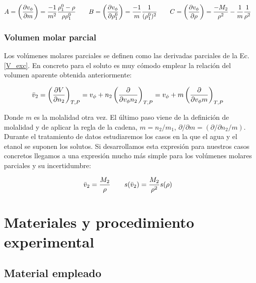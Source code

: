 \documentclass[a4paper,12pt,titlepage]{article}
\begin{document}
\begin{equation}
    \begin{gathered}
        A = \left( \pdv{v_{\phi}}{m} \right) = \frac{-1}{m^2} \frac{\rho_1^0 - \rho}{\rho \rho_1^0} \quad\quad
        B = \left( \pdv{v_{\phi}}{\rho_1^0} \right) = \frac{-1}{m} \frac{1}{(\rho_1^0)^2} \quad\quad
        C = \left( \pdv{v_{\phi}}{\rho} \right) = \frac{-M_2}{\rho^2} - \frac{1}{m} \frac{1}{\rho^2}
    \end{gathered}
\end{equation}

\subsubsection{Volumen molar parcial}

Los volúmenes molares parciales se definen como las derivadas parciales de la Ec.\ref{V_exc}. En concreto para el soluto es muy cómodo emplear la relación del volumen aparente obtenida anteriormente:

\begin{equation}
    \Bar{v}_2 = \left(\pdv{V}{n_2} \right)_{T,P} = v_{\phi} + n_2 \left( \pdv{v_{\phi}{n_2}} \right)_{T,P} = v_{\phi} + m\left( \pdv{v_{\phi}{m}} \right)_{T,P}
\end{equation}

Donde $m$ es la molalidad otra vez. El último paso viene de la definición de molalidad y de aplicar la regla de la cadena, $m=n_2/m_1$, $\partial/\partial m = (\partial/\partial n_2/m)$.
Durante el tratamiento de datos estudiaremos los casos en la que el agua y el etanol se suponen los solutos. Si desarrollamos esta expresión para nuestros casos concretos llegamos a una expresión mucho más simple para los volúmenes molares parciales y su incertidumbre:

\begin{equation}
        \Bar{v}_2 = \frac{M_2}{\rho} \quad \quad
        s(\Bar{v}_2) = \frac{M_2}{\rho^2} s(\rho)
\end{equation}


\section{Materiales y procedimiento experimental}

\subsection{Material empleado}
\end{document}
